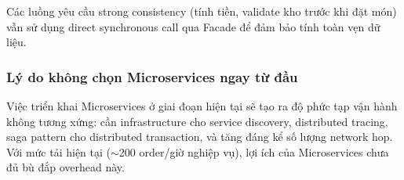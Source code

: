 Các luồng yêu cầu strong consistency (tính tiền, validate kho trước khi đặt món) vẫn sử dụng direct synchronous call qua Facade để đảm bảo tính toàn vẹn dữ liệu.
 
\subsubsection{Lý do không chọn Microservices ngay từ đầu}
 
Việc triển khai Microservices ở giai đoạn hiện tại sẽ tạo ra độ phức tạp vận hành không tương xứng: cần infrastructure cho service discovery, distributed tracing, saga pattern cho distributed transaction, và tăng đáng kể số lượng network hop. Với mức tải hiện tại ($\sim$200 order/giờ nghiệp vụ), lợi ích của Microservices chưa đủ bù đắp overhead này.
 
